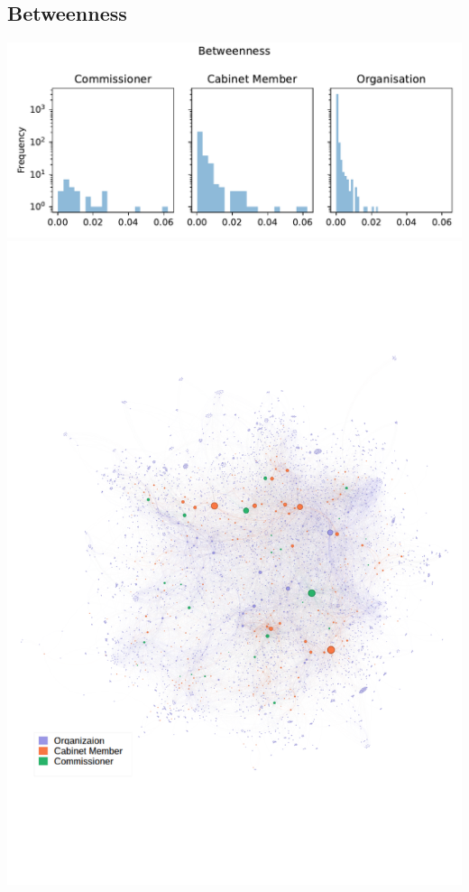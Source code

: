 \documentclass[ 11pt]{article}
\begin{document}
\subsection{Betweenness}
\includegraphics[scale=0.6]{../Programs/Figures/Betweenness.pdf}\\
\includegraphics[scale=0.5]{../Programs/Figures/Betweenness.png} 
\end{document}
